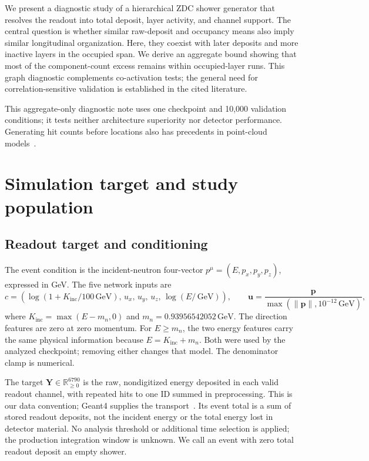 \documentclass[11pt]{article}
\newcommand{\GeV}{\,\mathrm{GeV}}
\newcommand{\Kinc}{K_{\mathrm{inc}}}
\newcommand{\Y}{\mathbf{Y}}
\begin{document}
We present a diagnostic study of a hierarchical ZDC shower generator that resolves the readout into total deposit, layer activity, and channel support. The central question is whether similar raw-deposit and occupancy means also imply similar longitudinal organization. Here, they coexist with later deposits and more inactive layers in the occupied span. We derive an aggregate bound showing that most of the component-count excess remains within occupied-layer runs. This graph diagnostic complements co-activation tests; the general need for correlation-sensitive validation is established in the cited literature.

This aggregate-only diagnostic note uses one checkpoint and 10,000 validation conditions; it tests neither architecture superiority nor detector performance. Generating hit counts before locations also has precedents in point-cloud models~\cite{caloclouds2,calopointflow}.

\section{Simulation target and study population}
\label{sec:data}

\subsection{Readout target and conditioning}

The event condition is the incident-neutron four-vector $p^\mu=(E,p_x,p_y,p_z)$, expressed in GeV. The five network inputs are
\begin{equation}
 c=\left(\log(1+\Kinc/100\GeV),\,u_x,\,u_y,\,u_z,\,\log(E/\GeV)\right),
 \qquad \mathbf u=\frac{\mathbf p}{\max(\lVert\mathbf p\rVert,10^{-12}\GeV)},
 \label{eq:condition}
\end{equation}
where $\Kinc=\max(E-m_n,0)$ and $m_n=0.93956542052\GeV$. The direction features are zero at zero momentum. For $E\geq m_n$, the two energy features carry the same physical information because $E=\Kinc+m_n$. Both were used by the analyzed checkpoint; removing either changes that model. The denominator clamp is numerical.

The target $\Y\in\mathbb R_{\geq0}^{6790}$ is the raw, nondigitized energy deposited in each valid readout channel, with repeated hits to one ID summed in preprocessing. This is our data convention; Geant4 supplies the transport~\cite{geant4}. Its event total is a sum of stored readout deposits, not the incident energy or the total energy lost in detector material. No analysis threshold or additional time selection is applied; the production integration window is unknown. We call an event with zero total readout deposit an empty shower.
\end{document}
